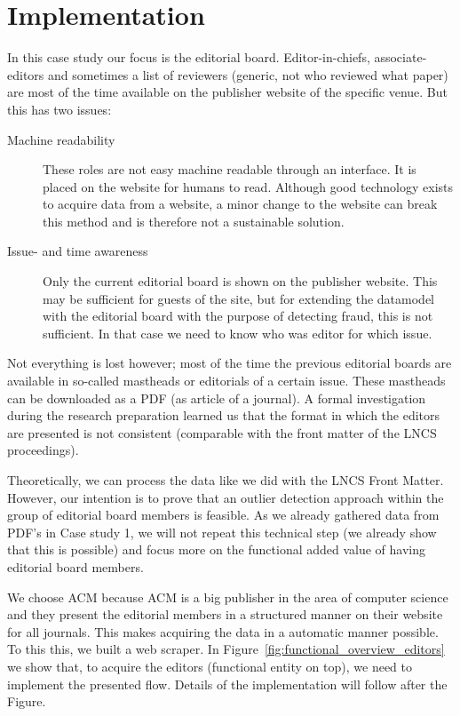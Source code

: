 \documentclass{ou-report}
\newcommand{\lncs}{LNCS}
\begin{document}
\section{Implementation}
In this case study our focus is the editorial board. Editor-in-chiefs, 
associate-editors and sometimes a list of reviewers (generic, not who reviewed 
what paper) are most of the time available on the publisher website of the 
specific venue. But this has two issues:
\begin{description}
    \item[Machine readability] These roles are not easy machine readable 
    through an interface. It is placed on the website for humans to read. 
    Although good technology exists to acquire data from a website, a minor 
    change to 
    the website can break this method and is therefore not a sustainable
    solution.
    \item[Issue- and time awareness] Only the current editorial board is 
    shown on the publisher website. This may be sufficient for guests of the 
    site, but for extending the datamodel with the editorial board with the 
    purpose of detecting fraud, this is not sufficient. In that case we need 
    to know who was editor for which issue. 
\end{description}
Not everything is lost however; most of the time the previous editorial 
boards are available in so-called mastheads or editorials of a certain 
issue. These 
mastheads can be downloaded as a PDF (as article of a journal). A formal 
investigation during the research preparation learned us that the format in 
which the editors are presented is not consistent (comparable with the 
front matter of the \lncs{} proceedings).

Theoretically, we can process the data like we did with the \lncs{} Front 
Matter. However, our intention is to prove that an outlier detection 
approach within the group of editorial board members is feasible. As we 
already gathered data from PDF's in Case study 1, we will not repeat this 
technical step (we already show that this is possible) and focus more on 
the functional added value of having editorial board members.

We choose ACM because ACM is a big publisher in the area of computer science
and they present the editorial members in a structured manner on their 
website for all journals. This makes acquiring the data in a automatic 
manner possible. To this this, we built a web scraper. In
Figure~\ref{fig:functional_overview_editors} we show that, to acquire the
editors (functional entity on top), we need to implement the presented flow.
Details of the implementation will follow after the Figure.
\end{document}
